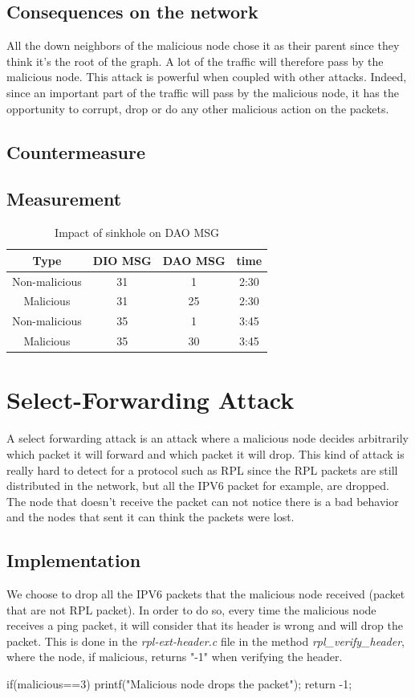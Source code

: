 \documentclass{report}
\begin{document}
\subsection*{Consequences on the network}
All the down neighbors of the malicious node chose it as their parent since they think it's the root of the graph. A lot of the traffic will therefore pass by the malicious node. This attack is powerful when coupled with other attacks. Indeed, since an important part of the traffic will pass by the malicious node, it has the opportunity to corrupt, drop or do any other malicious action on the packets.
\subsection*{Countermeasure}

\subsection*{Measurement}
\begin{table}[h!]
	\centering
	\caption{Impact of  sinkhole on DAO MSG}
	\begin{tabular}{cccc}
		\toprule
		Type&DIO MSG & DAO MSG&time\\
		\midrule
		Non-malicious&31&1&2:30\\
		Malicious&31&25&2:30\\
		Non-malicious&35&1&3:45\\%
		Malicious&35&30&3:45\\
		\bottomrule
	\end{tabular}
\end{table}

\section{Select-Forwarding Attack}
A select forwarding attack is an attack where a malicious node decides arbitrarily which packet it will forward and which packet it will drop. This kind of attack is really hard to detect for a protocol such as RPL since the RPL packets are still distributed in the network, but all the IPV6 packet for example, are dropped. The node that doesn't receive the packet can not notice there is a bad behavior and the nodes that sent it can think the packets were lost. 
\subsection*{Implementation}
We choose to drop all the IPV6 packets that the malicious node received (packet that are not RPL packet). In order to do so, every time the malicious node receives a ping packet, it will consider that its header is wrong and will drop the packet. This is done in the \textit{rpl-ext-header.c} file in the method \textit{rpl\_verify\_header}, where the node, if malicious, returns "-1" when verifying the header.  
\begin{myc}
if(malicious==3){
	printf("Malicious node drops the packet\n");
	return -1;
}	
\end{myc}
\end{document}
